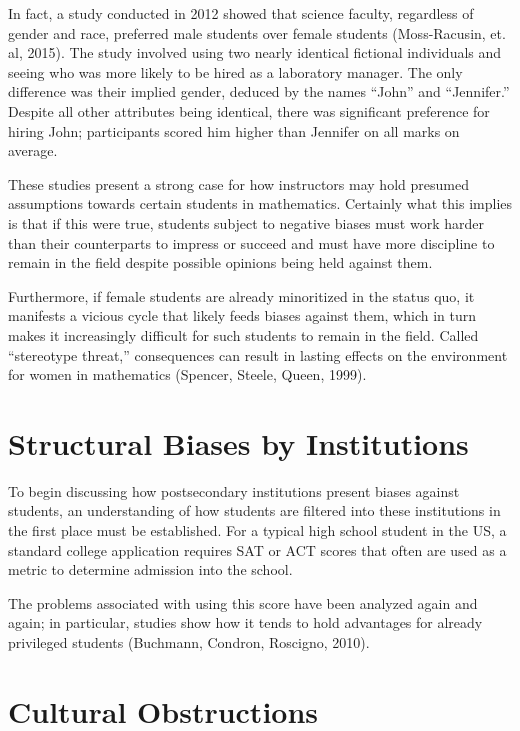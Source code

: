 In fact, a study conducted in 2012 showed that science faculty, regardless of gender and race, preferred male students over female students (Moss-Racusin, et. al, 2015). The study involved using two nearly identical fictional individuals and seeing who was more likely to be hired as a laboratory manager. The only difference was their implied gender, deduced by the names ``John'' and ``Jennifer.'' Despite all other attributes being identical, there was significant preference for hiring John; participants scored him higher than Jennifer on all marks on average.

These studies present a strong case for how instructors may hold presumed assumptions towards certain students in mathematics. Certainly what this implies is that if this were true, students subject to negative biases must work harder than their counterparts to impress or succeed and must have more discipline to remain in the field despite possible opinions being held against them.

Furthermore, if female students are already minoritized in the status quo, it manifests a vicious cycle that likely feeds biases against them, which in turn makes it increasingly difficult for such students to remain in the field. Called ``stereotype threat,'' consequences can result in lasting effects on the environment for women in mathematics (Spencer, Steele, Queen, 1999).

\section{Structural Biases by Institutions}
To begin discussing how postsecondary institutions present biases against students, an understanding of how students are filtered into these institutions in the first place must be established. For a typical high school student in the US, a standard college application requires SAT or ACT scores that often are used as a metric to determine admission into the school.

The problems associated with using this score have been analyzed again and again; in particular, studies show how it tends to hold advantages for already privileged students (Buchmann, Condron, Roscigno, 2010).

\section{Cultural Obstructions}
